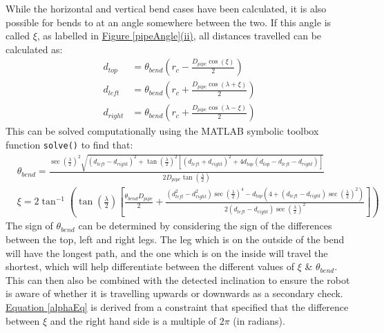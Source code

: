 \documentclass[11pt]{article}		%
\newcommand{\equationref}[1]{\hyperref[#1]{Equation \ref*{#1}}}     %
\begin{document}
		While the horizontal and vertical bend cases have been calculated, it is also possible for bends to at an angle somewhere between the two.
		If this angle is called $\xi$, as labelled in \hyperref[pipeAngle]{Figure \ref*{pipeAngle}(ii)}, all distances travelled can be calculated as:
		\begin{align}
			d_{top} &= \theta_{bend} \left( r_c - \frac{D_{pipe} \cos \left( \xi \right)}{2} \right) \label{d_top}
			\\
			d_{left} &= \theta_{bend} \left( r_c +  \frac{D_{pipe} \cos \left( \lambda + \xi \right)}{2} \right) \label{d_left}
			\\
			d_{right} &= \theta_{bend} \left( r_c +  \frac{D_{pipe} \cos \left( \lambda - \xi \right)}{2} \right) \label{d_right}
		\end{align}
		This can be solved computationally using the MATLAB symbolic toolbox function \verb|solve()| to find that:	
		\fontsize{10}{\baselineskip}
		\begin{align}
			&\theta_{bend} = \frac{ \sec \left( \frac{\lambda}{2} \right)^2 \sqrt{ \left( d_{left} - d_{right} \right)^2 +  \tan \left( \frac{\lambda}{2} \right)^2 \left[ \left( d_{left} + d_{right} \right)^2 + 4 d_{top} \left( d_{top} - d_{left} - d_{right} \right) \right] } }{2 D_{pipe} \tan \left( \frac{\lambda}{2} \right)} \label{generalTheta}
			\\
			&\xi = 2 \tan^{-1} \left( \tan \left( \frac{\lambda}{2} \right) \left[\frac{ \theta_{bend} D_{pipe}}{2} + \frac{\left( d_{left}^2 - d_{right}^2 \right) \sec \left( \frac{\lambda}{2} \right)^4 - d_{top} \left(4 + \left( d_{left} - d_{right} \right) \sec \left( \frac{\lambda}{2} \right)^2 \right)}{2 \left( d_{left} - d_{right} \right) \sec \left( \frac{\lambda}{2} \right)^2} \right] \right) \label{alphaEq}
		\end{align}
		\fontsize{11}{\baselineskip}
		The sign of $\theta_{bend}$ can be determined by considering the sign of the differences between the top, left and right legs.
		The leg which is on the outside of the bend will have the longest path, and the one which is on the inside will travel the shortest, which will help differentiate between the different values of $\xi$ \& $\theta_{bend}$.
		This can then also be combined with the detected inclination to ensure the robot is aware of whether it is travelling upwards or downwards as a secondary check.
		\\
		\equationref{alphaEq} is derived from a constraint that specified that the difference between $\xi$ and the right hand side is a multiple of $2 \pi$ (in radians).
\end{document}
